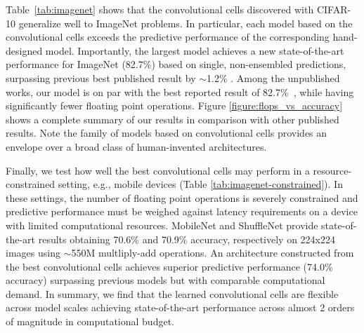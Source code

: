 \documentclass[10pt,twocolumn,letterpaper]{article}
\begin{document}
Table~\ref{tab:imagenet} shows that the convolutional cells discovered with CIFAR-10 generalize well to ImageNet problems.
In particular, each model based on the convolutional cells exceeds the predictive performance of the corresponding hand-designed model.
Importantly, the largest model achieves a new state-of-the-art performance for ImageNet (82.7\%) based on single, non-ensembled predictions, surpassing previous best published result by $\sim$1.2\% \cite{dualpath}. Among the unpublished works, our model is on par with the best reported result of 82.7\%~\cite{hu2017squeeze}, while having significantly fewer floating point operations.
Figure \ref{figure:flops_vs_accuracy} shows a complete summary of our results in comparison with other published results. Note the family of models based on convolutional cells provides an envelope over a broad class of human-invented architectures.


Finally, we test how well the best convolutional cells may perform in a resource-constrained setting, e.g.,  mobile devices (Table \ref{tab:imagenet-constrained}). In these settings, the number of floating point operations is severely constrained and predictive performance must be weighed against latency requirements on a device with limited computational resources. MobileNet \cite{howard2017mobilenets} and ShuffleNet \cite{shufflenet} provide state-of-the-art results obtaining 70.6\% and 70.9$\%$ accuracy, respectively on 224x224 images using $\sim$550M multliply-add operations. An architecture constructed from the best convolutional cells  achieves superior predictive performance (74.0\% accuracy) surpassing previous models but with comparable computational demand. In summary, we find that the learned convolutional cells are flexible across model scales achieving state-of-the-art performance across almost 2 orders of magnitude in computational budget.
\end{document}
